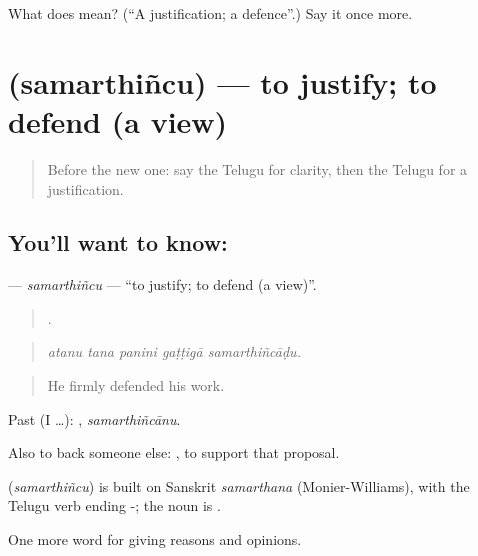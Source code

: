 \begin{tcolorbox}[breakable,colback=teal!4,colframe=teal!35!black,title={Before you move on}]
What does  mean? (\textquotedblleft{}A justification; a defence\textquotedblright{}.) Say it once more.
\end{tcolorbox}
\section[\texorpdfstring{\te{సమర్థించు} (samarthiñcu)}{సమర్థించు (samarthiñcu)}]{ (samarthiñcu) — to justify; to defend (a view)}

\label{lesson:TE-C394-samarthincu}



\begin{quote}
Before the new one: say the Telugu for clarity, then the Telugu for a justification.
\end{quote}

\subsection*{You'll want to know: }
\textbf{} — \emph{samarthiñcu} — \textquotedblleft{}to justify; to defend (a view)\textquotedblright{}.

\begin{quote}
    .
\end{quote}

\begin{quote}
\emph{atanu tana panini gaṭṭigā samarthiñcāḍu.}
\end{quote}

\begin{quote}
He firmly defended his work.
\end{quote}

Past (I …): , \emph{samarthiñcānu}.

Also to back someone else:   , to support that proposal.

\begin{cousinweb}
\textbf{} (\emph{samarthiñcu}) is built on Sanskrit \emph{samarthana} (Monier-Williams), with the Telugu verb ending -; the noun is .
\end{cousinweb}

\begin{grammarlens}[title={What you've built}]
One more word for giving reasons and opinions.
\end{grammarlens}

